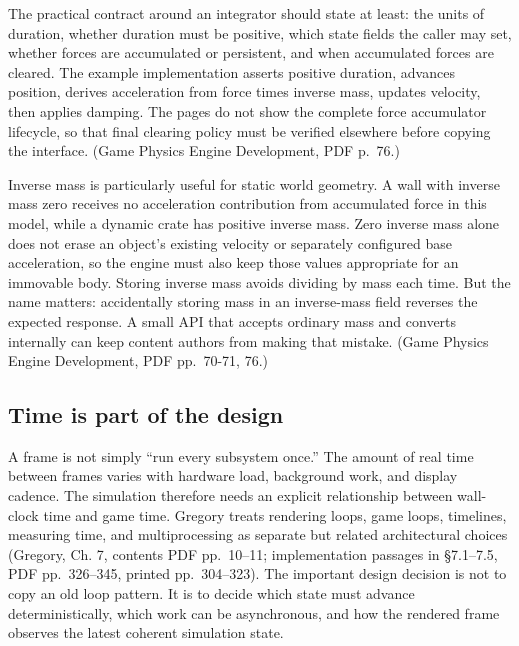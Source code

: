The practical contract around an integrator should state at least: the units of duration, whether duration must be positive, which state fields the caller may set, whether forces are accumulated or persistent, and when accumulated forces are cleared. The example implementation asserts positive duration, advances position, derives acceleration from force times inverse mass, updates velocity, then applies damping. The pages do not show the complete force accumulator lifecycle, so that final clearing policy must be verified elsewhere before copying the interface. (Game Physics Engine Development, PDF p.~76.)

Inverse mass is particularly useful for static world geometry. A wall with inverse mass zero receives no acceleration contribution from accumulated force in this model, while a dynamic crate has positive inverse mass. Zero inverse mass alone does not erase an object's existing velocity or separately configured base acceleration, so the engine must also keep those values appropriate for an immovable body. Storing inverse mass avoids dividing by mass each time. But the name matters: accidentally storing mass in an inverse-mass field reverses the expected response. A small API that accepts ordinary mass and converts internally can keep content authors from making that mistake. (Game Physics Engine Development, PDF pp.~70-71, 76.)

\subsection{Time is part of the design}\label{05-engine-i-ch014-time-is-part-of-the-design}

\hypertarget{05-engine-i-ch014-time-is-part-of-the-design}{}

A frame is not simply ``run every subsystem once.'' The amount of real time between frames varies with hardware load, background work, and display cadence. The simulation therefore needs an explicit relationship between wall-clock time and game time. Gregory treats rendering loops, game loops, timelines, measuring time, and multiprocessing as separate but related architectural choices (Gregory, Ch. 7, contents PDF pp.~10--11; implementation passages in §7.1--7.5, PDF pp.~326--345, printed pp.~304--323). The important design decision is not to copy an old loop pattern. It is to decide which state must advance deterministically, which work can be asynchronous, and how the rendered frame observes the latest coherent simulation state.

